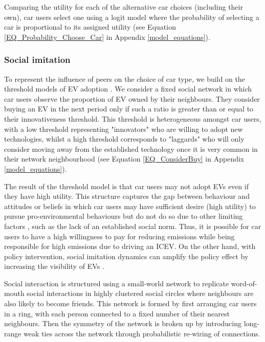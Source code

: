 \documentclass[12pt]{article}
\begin{document}
	Comparing the utility for each of the alternative car choices (including their own), car users select one using a logit model \citep{McFadden1974} where the probability of selecting a car is proportional to its assigned utility (see Equation \ref{EQ_Probability_Choose_Car} in Appendix \ref{model_equations}). %

	\subsubsection{Social imitation} \label{Users_SocialImitation}

	To represent the influence of peers on the choice of car type, we build on the threshold models of EV adoption \citep{eppstein2011agent, mccoy2014consumer, wang2023exploring}. We consider a fixed social network in which car users observe the proportion of EV owned by their neighbours. They consider buying an EV in the next period only if such a ratio is greater than or equal to their innovativeness threshold. This threshold is heterogeneous amongst car users, with a low threshold representing "innovators" who are willing to adopt new technologies, whilst a high threshold corresponds to "laggards" who will only consider moving away from the established technology once it is very common in their network neighbourhood (see Equation \ref{EQ_ConsiderBuy} in Appendix \ref{model_equations}).

	The result of the threshold model is that car users may not adopt EVs even if they have high utility. This structure captures the gap between behaviour and attitudes or beliefs in which car users may have sufficient desire (high utility) to pursue pro-environmental behaviours but do not do so due to other limiting factors \citep{kollmuss2002mind}, such as the lack of an established social norm. Thus, it is possible for car users to have a high willingness to pay for reducing emissions while being responsible for high emissions due to driving an ICEV. On the other hand, with policy intervention, social imitation dynamics can amplify the policy effect by increasing the visibility of EVs \citep{konc2021social}.

	Social interaction is structured using a small-world network \citep{watts1998collective} to replicate word-of-mouth social interactions in highly clustered social circles where neighbours are also likely to become friends. This network is formed by first arranging car users in a ring, with each person connected to a fixed number of their nearest neighbours. Then the symmetry of the network is broken up by introducing long-range weak ties across the network through probabilistic re-wiring of connections.
\end{document}
